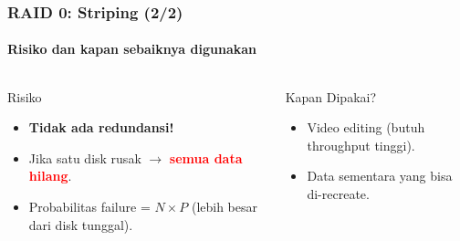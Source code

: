 \documentclass[t,aspectratio=169,xcolor=dvipsnames]{beamer}
\newcommand{\tem}[1]{\textbf{\textcolor{red}{#1}}}
\begin{document}
\begin{frame}[shrink=5]
    \frametitle{RAID 0: Striping (2/2)}
    \framesubtitle{Risiko dan kapan sebaiknya digunakan}

    \begin{columns}[T]
        \begin{alertblock}{Risiko}
            \small
            \begin{itemize}
                \item \textbf{Tidak ada redundansi!}
                \item Jika satu disk rusak $\to$ \tem{semua data hilang}.
                \item Probabilitas failure = $N \times P$ (lebih besar dari disk tunggal).
            \end{itemize}
        \end{alertblock}

        \begin{block}{Kapan Dipakai?}
            \small
            \begin{itemize}
                \item Video editing (butuh throughput tinggi).
                \item Data sementara yang bisa di-recreate.
            \end{itemize}
        \end{block}
    \end{columns}
\end{frame}
\end{document}
